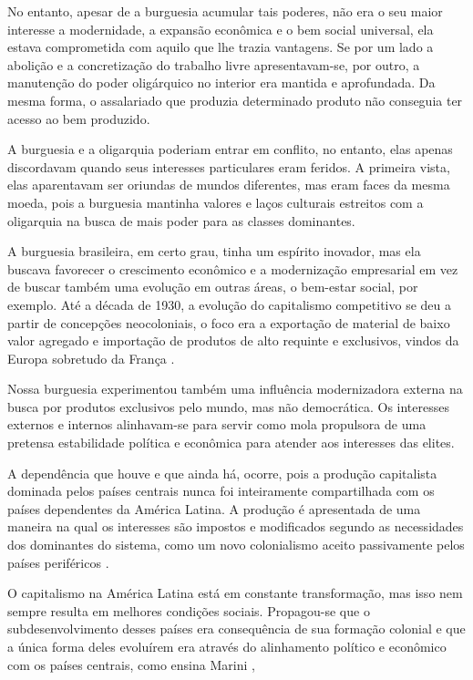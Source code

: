 No entanto, apesar de a burguesia acumular tais poderes, não era o seu maior interesse a modernidade, a expansão econômica e o bem social universal, ela estava comprometida com aquilo que lhe trazia vantagens. Se por um lado a abolição e a concretização do trabalho livre apresentavam-se, por outro, a manutenção do poder oligárquico no interior era mantida e aprofundada. Da mesma forma, o assalariado que produzia determinado produto não conseguia ter acesso ao bem produzido.

A burguesia e a oligarquia poderiam entrar em conflito, no entanto, elas apenas discordavam quando seus interesses particulares eram feridos. A primeira vista, elas aparentavam ser oriundas de mundos diferentes, mas eram faces da mesma moeda, pois a burguesia mantinha valores e laços culturais estreitos com a oligarquia na busca de mais poder para as classes dominantes.

A burguesia brasileira, em certo grau, tinha um espírito inovador, mas ela buscava favorecer o crescimento econômico e a modernização empresarial em vez de buscar também uma evolução em outras áreas, o bem-estar social, por exemplo. Até a década de 1930, a evolução do capitalismo competitivo se deu a partir de concepções neocoloniais, o foco era a exportação de material de baixo valor agregado e importação de produtos de alto requinte e exclusivos, vindos da Europa sobretudo da França \cite{bueno2016gastronomia}.

Nossa burguesia experimentou também uma influência modernizadora externa na busca por produtos exclusivos pelo mundo, mas não democrática. Os interesses externos e internos alinhavam-se para servir como mola propulsora de uma pretensa estabilidade política e econômica para atender aos interesses das elites.

A dependência que houve e que ainda há, ocorre, pois a produção capitalista dominada pelos países centrais nunca foi inteiramente compartilhada com os países dependentes da América Latina. A produção é apresentada de uma maneira na qual os interesses são impostos e modificados segundo as necessidades dos dominantes do sistema, como um novo colonialismo aceito passivamente pelos países periféricos \cite{bambirra2012}.

O capitalismo na América Latina está em constante transformação, mas isso nem sempre resulta em melhores condições sociais. Propagou-se que o subdesenvolvimento desses países era consequência de sua formação colonial e que a única forma deles evoluírem era através do alinhamento político e econômico com os países centrais, como ensina Marini \cite{marini2005140},

